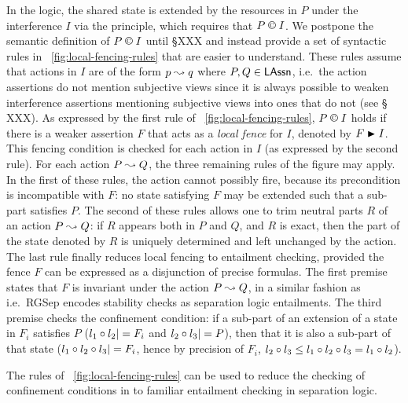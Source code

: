In the logic, the shared state is extended by the resources in $P$ under
the interference $I$ via the \extendRule principle, which requires
that $P\containI I$. We postpone the semantic definition of $P \confines I$ until \S XXX and instead provide a set of syntactic rules in \fig~\ref{fig:local-fencing-rules} that are easier to understand.
These rules assume that actions in
$I$ are of the form $\lass{P} \swap \lass{Q}$ where
$P,Q\in\mathsf{LAssn}$, i.e.\ the action assertions do not
mention subjective views since it is always possible to weaken
interference assertions mentioning subjective views into ones that do not (see \S
XXX). As expressed by the first rule of
\fig~\ref{fig:local-fencing-rules}, $P\containI I$ holds if there is a
weaker assertion $F$ that acts as a \emph{local fence} for $I$,
denoted by $F\strictfences I$. This fencing condition is checked for
each action in $I$ (as expressed by the second rule). For each action
$P\mathrel{\leadsto} Q$, the three remaining rules of the figure may apply. In the
first of these rules, the action cannot possibly fire, because its
precondition is incompatible with $F$: no state satisfying $F$ may be
extended such that a sub-part satisfies $P$. The second of these rules
allows one to trim neutral parts $R$ of an action $P\mathrel{\leadsto} Q$: if $R$
appears both in $P$ and $Q$, and $R$ is exact, then the part of the
state denoted by $R$ is uniquely determined and left unchanged by the
action. The last rule finally reduces local fencing to entailment
checking, provided the fence $F$ can be expressed as a disjunction of
precise formulas. The first premise states that $F$ is invariant under
the action $P\mathrel{\leadsto} Q$, in a similar fashion as i.e.\ RGSep
encodes stability checks as separation logic entailments. The third
premise checks the confinement condition: if a sub-part of an
extension of a state in $F_i$ satisfies $P$ ($l_1\circ l_2|= F_i$
and $l_2\circ l_3 |= P$), then that it is also a sub-part of that
state ($l_1\circ l_2\circ l_3|=F_i$, hence by precision of
$F_i$, $l_2\circ l_3\leq l_1\circ l_2\circ l_3 =
l_1\circ l_2$).

The rules of \fig~\ref{fig:local-fencing-rules} can be used to reduce
the checking of confinement conditions in \colosl to familiar
entailment checking in separation logic.


